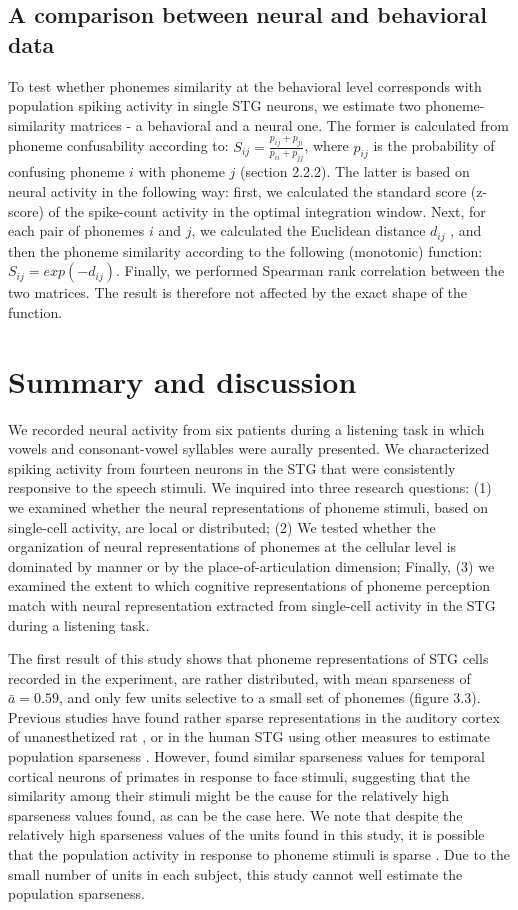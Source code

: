 \subsection{A comparison between neural and behavioral data}
To test whether phonemes similarity at the behavioral level corresponds with population spiking activity in single STG neurons, we estimate two phoneme-similarity matrices - a behavioral and a neural one. The former is calculated from phoneme confusability according to: $S_{ij}=\frac{p_{ij}+p_{ji}}{p_{ii}+p_{jj}}$, where $p_{ij}$ is the probability of confusing phoneme $i$ with phoneme $j$ (section 2.2.2). The latter is based on neural activity in the following way: first, we calculated the standard score (z-score) of the spike-count activity in the optimal integration window. Next, for each pair of phonemes $i$ and $j$, we calculated the Euclidean distance $d_{ij}$ \citep{khalighinejad2017dynamic}, and then the phoneme similarity according to the following (monotonic) function: $S_{ij}=exp(-d_{ij})$. Finally, we performed Spearman rank correlation between the two matrices. The result is therefore not affected by the exact shape of the function. 

\section{Summary and discussion}
We recorded neural activity from six patients during a listening task in which vowels and consonant-vowel syllables were aurally presented. We characterized spiking activity from fourteen neurons in the STG that were consistently responsive to the speech stimuli. We inquired into three research questions: (1) we examined whether the neural representations of phoneme stimuli, based on single-cell activity, are local or distributed; (2) We tested whether the organization of neural representations of phonemes at the cellular level is dominated by manner or by the place-of-articulation dimension; Finally, (3) we examined the extent to which cognitive representations of phoneme perception match with neural representation extracted from single-cell activity in the STG during a listening task.

The first result of this study shows that phoneme representations of STG cells recorded in the experiment, are rather distributed, with mean sparseness \citep{treves1991determines} of $\bar{a}=0.59$, and only few units selective to a small set of phonemes (figure 3.3). Previous studies have found rather sparse representations in the auditory cortex of unanesthetized rat \citep{hromadka2008sparse}, or in the human STG using other measures to estimate population sparseness \citep{chan2013speech}. However, \citet{rolls1995sparseness} found similar sparseness values for temporal cortical neurons of primates in response to face stimuli, suggesting that the similarity among their stimuli might be the cause for the relatively high sparseness values found, as can be the case here. We note that despite the relatively high sparseness values of the units found in this study, it is possible that the population activity in response to phoneme stimuli is sparse \citep{olshausen2004sparse}. Due to the small number of units in each subject, this study cannot well estimate the population sparseness.

